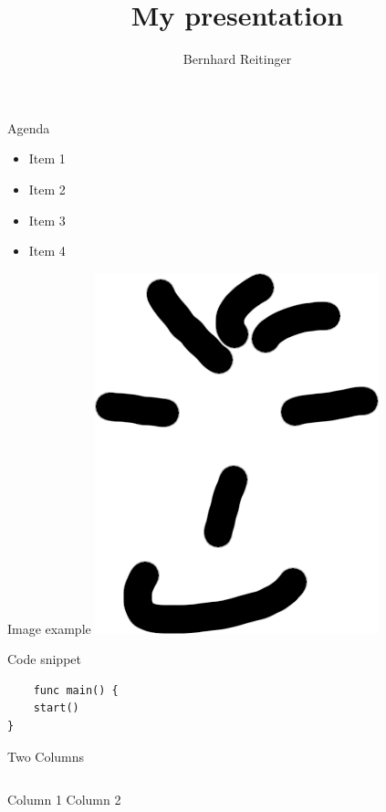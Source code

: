 \documentclass[aspectratio=43]{beamer}
\title{My presentation}
\author{Bernhard Reitinger}
\begin{document}

\maketitle

\begin{frame}{Agenda}

    \begin{itemize}
        \item Item 1
            \pause{}
        \item Item 2
        \item Item 3
        \item Item 4
    \end{itemize}

\end{frame}

\begin{frame}{Image example}
    \centering
    \includegraphics[height=0.7\textheight]{anonymous.png}
\end{frame}

\begin{frame}[fragile]{Code snippet}
    \begin{verbatim}
    func main() {
    start()
}
    \end{verbatim}
\end{frame}

\begin{frame}{Two Columns}
    \begin{columns}
        \centering
        Column 1
        \centering
        Column 2
    \end{columns}
\end{frame}
\end{document}
